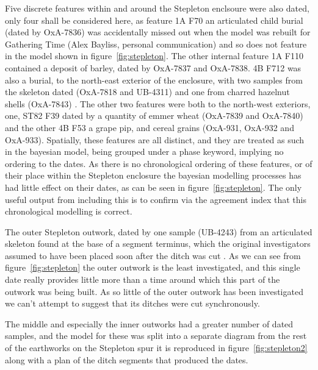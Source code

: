 Five discrete features within and around the Stepleton enclsoure were also dated, only four shall be considered here, as feature 1A F70 an articulated child burial (dated by OxA-7836) was accidentally missed out when the model was rebuilt for Gathering Time (Alex Bayliss, personal communication) and so does not feature in the model shown in figure~\ref{fig:stepleton}. The other internal feature 1A F110 contained a deposit of barley, dated by OxA-7837 and OxA-7838. 4B F712 was also a burial, to the north-east exterior of the enclosure, with two samples from the skeleton dated (OxA-7818 and UB-4311) and one from charred hazelnut shells (OxA-7843) \citep[396]{Mercer:2008fk}. The other two features were both to the north-west exteriors, one, ST82 F39 dated by a quantity of emmer wheat (OxA-7839 and OxA-7840) and the other 4B F53 a grape pip, and cereal grains (OxA-931, OxA-932 and OxA-933). Spatially, these features are all distinct, and they are treated as such in the bayesian model, being grouped under a phase keyword, implying no ordering to the dates. As there is no chronological ordering of these features, or of their place within the Stepleton enclosure the bayesian modelling processes has had little effect on their dates, as can be seen in figure~\ref{fig:stepleton}. The only useful output from including this is to confirm via the agreement index that this chronological modelling is correct.

The outer Stepleton outwork, dated by one sample (UB-4243) from an articulated skeleton found at the base of a segment terminus, which the original investigators assumed to have been placed soon after the ditch was cut \cite[396]{Mercer:2008fk}. As we can see from figure~\ref{fig:stepleton} the outer outwork is the least investigated, and this single date really provides little more than a time around which this part of the outwork was being built. As so little of the outer outwork has been investigated we can't attempt to suggest that its ditches were cut synchronously.

The middle and especially the inner outworks had a greater number of dated samples, and the model for these was split into a separate diagram from the rest of the earthworks on the Stepleton spur it is reproduced in figure~\ref{fig:stepleton2} along with a plan of the ditch segments that produced the dates.

